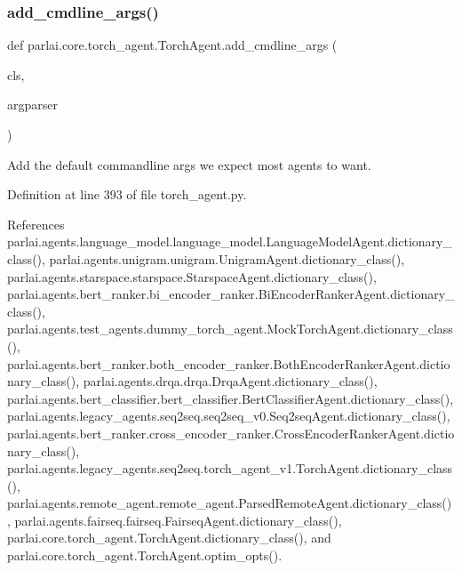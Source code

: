 \subsubsection{\texorpdfstring{add\+\_\+cmdline\+\_\+args()}{add\_cmdline\_args()}}
{\footnotesize\ttfamily def parlai.\+core.\+torch\+\_\+agent.\+Torch\+Agent.\+add\+\_\+cmdline\+\_\+args (\begin{DoxyParamCaption}\item[{}]{cls,  }\item[{}]{argparser }\end{DoxyParamCaption})}

\begin{DoxyVerb}Add the default commandline args we expect most agents to want.\end{DoxyVerb}
 

Definition at line 393 of file torch\+\_\+agent.\+py.



References parlai.\+agents.\+language\+\_\+model.\+language\+\_\+model.\+Language\+Model\+Agent.\+dictionary\+\_\+class(), parlai.\+agents.\+unigram.\+unigram.\+Unigram\+Agent.\+dictionary\+\_\+class(), parlai.\+agents.\+starspace.\+starspace.\+Starspace\+Agent.\+dictionary\+\_\+class(), parlai.\+agents.\+bert\+\_\+ranker.\+bi\+\_\+encoder\+\_\+ranker.\+Bi\+Encoder\+Ranker\+Agent.\+dictionary\+\_\+class(), parlai.\+agents.\+test\+\_\+agents.\+dummy\+\_\+torch\+\_\+agent.\+Mock\+Torch\+Agent.\+dictionary\+\_\+class(), parlai.\+agents.\+bert\+\_\+ranker.\+both\+\_\+encoder\+\_\+ranker.\+Both\+Encoder\+Ranker\+Agent.\+dictionary\+\_\+class(), parlai.\+agents.\+drqa.\+drqa.\+Drqa\+Agent.\+dictionary\+\_\+class(), parlai.\+agents.\+bert\+\_\+classifier.\+bert\+\_\+classifier.\+Bert\+Classifier\+Agent.\+dictionary\+\_\+class(), parlai.\+agents.\+legacy\+\_\+agents.\+seq2seq.\+seq2seq\+\_\+v0.\+Seq2seq\+Agent.\+dictionary\+\_\+class(), parlai.\+agents.\+bert\+\_\+ranker.\+cross\+\_\+encoder\+\_\+ranker.\+Cross\+Encoder\+Ranker\+Agent.\+dictionary\+\_\+class(), parlai.\+agents.\+legacy\+\_\+agents.\+seq2seq.\+torch\+\_\+agent\+\_\+v1.\+Torch\+Agent.\+dictionary\+\_\+class(), parlai.\+agents.\+remote\+\_\+agent.\+remote\+\_\+agent.\+Parsed\+Remote\+Agent.\+dictionary\+\_\+class(), parlai.\+agents.\+fairseq.\+fairseq.\+Fairseq\+Agent.\+dictionary\+\_\+class(), parlai.\+core.\+torch\+\_\+agent.\+Torch\+Agent.\+dictionary\+\_\+class(), and parlai.\+core.\+torch\+\_\+agent.\+Torch\+Agent.\+optim\+\_\+opts().

